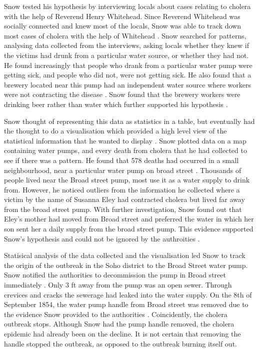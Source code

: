 \documentclass[12pt]{article}
\begin{document}
Snow tested his hypothesis by interviewing locals about cases relating to cholera with the help of Reverend Henry Whitehead. Since Reverend Whitehead was socially connected and knew most of the locals, Snow was able to track down most cases of cholera with the help of Whitehead \cite{tedtalk}. Snow searched for patterns, analysing data collected from the interviews, asking locals whether they knew if the victims had drunk from a particular water source, or whether they had not. He found increasingly that people who drank from a particular water pump were getting sick, and people who did not, were not getting sick. He also found that a brewery located near this pump had an independent water source where workers were not contracting the disease \cite{blog}. Snow found that the brewery workers were drinking beer rather than water which further supported his hypothesis \cite{youtube}.

Snow thought of representing this data as statistics in a table, but eventually had the thought to do a visualisation which provided a high level view of the statistical information that he wanted to display \cite{tedtalk}. Snow plotted data on a map containing water pumps, and every death from cholera that he had collected to see if there was a pattern. He found that 578 deaths had occurred in a small neighbourhood, near a particular water pump on broad street \cite{channel1}. Thousands of people lived near the Broad street pump, most use it as a water supply to drink from. However, he noticed outliers from the information he collected where a victim by the name of Susanna Eley had contracted cholera but lived far away from the broad street pump. With further investigation, Snow found out that Eley's mother had moved from Broad street and preferred the water in which her son sent her a daily supply from the broad street pump. This evidence supported Snow's hypothesis and could not be ignored by the authroities \cite{channel1}. 

Statisical analysis of the data collected and the visualisation led Snow to track the origin of the outbreak in the Soho district to the Broad Street water pump. Snow notified the authorities to decommission the pump in Broad street immediately \cite{test}. Only 3 ft away from the pump was an open sewer. Through crevices and cracks the sewerage had leaked into the water supply.
On the 8th of September 1854, the water pump handle from Broad street was removed due to the evidence Snow provided to the authorities \cite{youtube}. Coincidently, the cholera outbreak stops. Although Snow had the pump handle removed, the cholera epidemic had already been on the decline. It is not certain that removing the handle stopped the outbreak, as opposed to the outbreak burning itself out. 
\end{document}

